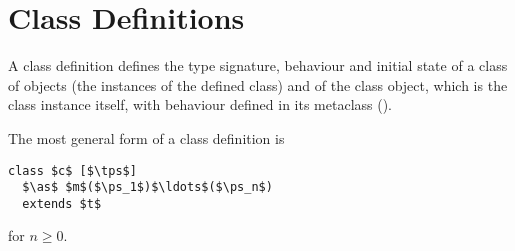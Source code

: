 \section{Class Definitions}
\label{sec:class-definitions}

A class definition defines the type signature, behaviour and initial state of a class of objects (the instances of the defined class) and of the class object, which is the class instance itself, with behaviour defined in its metaclass (). 

The most general form of a class definition is
\begin{lstlisting}
class $c$ [$\tps$]
  $\as$ $m$($\ps_1$)$\ldots$($\ps_n$)
  extends $t$
\end{lstlisting}
for $n \geq 0$. 

